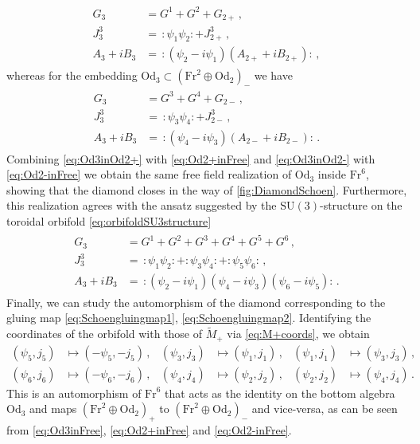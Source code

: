 \documentclass{pspum-l}
\newcommand{\normord}[1]{:\mathrel{#1}:} %
\theoremstyle{definition}
\theoremstyle{remark}
\numberwithin{equation}{section}
\begin{document}
\begin{align}
\begin{split}
\label{eq:Od3inOd2+}
     G_{3}&=G^1 + G^2 + G_{2+} \, ,\\
     J^3_{3}&=\,\normord{\psi_1\psi_2}+J^3_{2+} \, ,\\
    A_{3}+i B_{3}&=\,\normord{(\psi_2-i\psi_1)\left(A_{2+}+i B_{2+}\right)} \, ,
\end{split}
\end{align}
whereas for the embedding $\text{Od}_3\subset\left( \text{Fr}^2\oplus \text{Od}_2 \right)_-$ we have
\begin{align}
\begin{split}
\label{eq:Od3inOd2-}
     G_{3}&=G^3 + G^4 + G_{2-} \, ,\\
     J^3_{3}&=\,\normord{\psi_3\psi_4}+J^3_{2-} \, ,\\
    A_{3}+i B_{3}&=\,\normord{(\psi_4-i\psi_3)\left(A_{2-}+i B_{2-}\right)} \, .
    \end{split}
\end{align}
Combining \eqref{eq:Od3inOd2+} with \eqref{eq:Od2+inFree} and \eqref{eq:Od3inOd2-} with \eqref{eq:Od2-inFree} we obtain the same free field realization of $\text{Od}_3$ inside $\text{Fr}^6$, showing that the diamond closes in the way of \cref{fig:DiamondSchoen}. Furthermore, this realization agrees with the ansatz suggested by the $\text{SU}(3)$-structure on the toroidal orbifold \eqref{eq:orbifoldSU3structure}
\begin{align}
\begin{split}
\label{eq:Od3inFree}
     G_{3}&=G^1 + G^2 + G^3 + G^4 + G^5 + G^6 \, ,\\
     J^3_{3}&=\,\normord{\psi_1\psi_2}+\normord{\psi_3\psi_4}+\normord{\psi_5\psi_6} \, ,\\
    A_{3}+i B_{3}&=\,\normord{(\psi_2-i\psi_1)(\psi_4-i\psi_3)(\psi_6-i\psi_5)} \, .
\end{split}
\end{align}
Finally, we can study the automorphism of the diamond corresponding to the gluing map \eqref{eq:Schoengluingmap1}, \eqref{eq:Schoengluingmap2}. Identifying the coordinates of the orbifold with those of $\widetilde{M}_+$ via \eqref{eq:M+coords}, we obtain
\begin{align}
\label{eq:Schoengluingauto1}
    \left(\psi_5,j_5\right)&\longmapsto \left(-\psi_5,-j_5\right)\, ,& \left(\psi_3,j_3\right)&\longmapsto \left(\psi_1,j_1\right)\, ,& \left(\psi_1,j_1\right)&\longmapsto \left(\psi_3,j_3\right)\, , \\
    \label{eq:Schoengluingauto2}
    \left(\psi_6,j_6\right)&\longmapsto \left(-\psi_6,-j_6\right)\, ,& \left(\psi_4,j_4\right)&\longmapsto \left(\psi_2,j_2\right)\, ,& \left(\psi_2,j_2\right)&\longmapsto \left(\psi_4,j_4\right)\,  .
\end{align}
This is an automorphism of $\text{Fr}^6$ that acts as the identity on the bottom algebra $\text{Od}_3$ and maps $\left( \text{Fr}^2\oplus \text{Od}_2 \right)_+$ to $\left( \text{Fr}^2\oplus \text{Od}_2 \right)_-$ and vice-versa, as can be seen from \eqref{eq:Od3inFree}, \eqref{eq:Od2+inFree} and \eqref{eq:Od2-inFree}.
\end{document}
